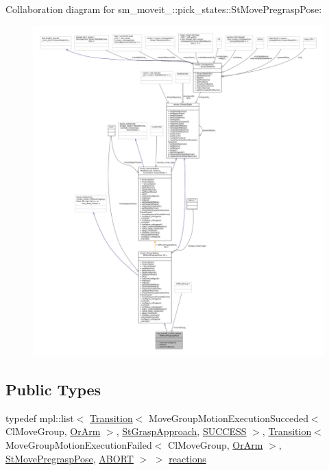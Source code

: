 Collaboration diagram for sm\+\_\+moveit\+\_\+:\+:pick\+\_\+states\+:\+:St\+Move\+Pregrasp\+Pose\+:
\nopagebreak
\begin{figure}[H]
\begin{center}
\leavevmode
\includegraphics[width=350pt]{structsm__moveit__4_1_1pick__states_1_1StMovePregraspPose__coll__graph}
\end{center}
\end{figure}
\subsection*{Public Types}
\begin{DoxyCompactItemize}
\item 
typedef mpl\+::list$<$ \hyperlink{classsmacc_1_1Transition}{Transition}$<$ Move\+Group\+Motion\+Execution\+Succeded$<$ Cl\+Move\+Group, \hyperlink{classsm__moveit__4_1_1OrArm}{Or\+Arm} $>$, \hyperlink{structsm__moveit__4_1_1pick__states_1_1StGraspApproach}{St\+Grasp\+Approach}, \hyperlink{structsmacc_1_1default__transition__tags_1_1SUCCESS}{S\+U\+C\+C\+E\+SS} $>$, \hyperlink{classsmacc_1_1Transition}{Transition}$<$ Move\+Group\+Motion\+Execution\+Failed$<$ Cl\+Move\+Group, \hyperlink{classsm__moveit__4_1_1OrArm}{Or\+Arm} $>$, \hyperlink{structsm__moveit__4_1_1pick__states_1_1StMovePregraspPose}{St\+Move\+Pregrasp\+Pose}, \hyperlink{structsmacc_1_1default__transition__tags_1_1ABORT}{A\+B\+O\+RT} $>$ $>$ \hyperlink{structsm__moveit__4_1_1pick__states_1_1StMovePregraspPose_a4329bf7123b5978a7418bda57b17541d}{reactions}
\end{DoxyCompactItemize}
